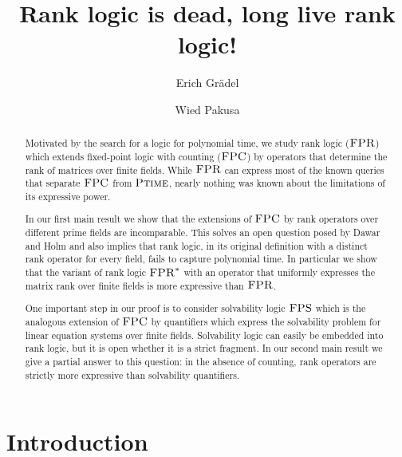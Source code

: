 \documentclass[a4paper,UKenglish]{lipics}
\title{Rank logic is dead, long live rank logic!}
\author{Erich Grädel}
\author{Wied Pakusa}
\affil{Mathematical Foundations of Computer Science, RWTH Aachen University\\
  \texttt{\{graedel,pakusa\}@logic.rwth-aachen.de}}
\newcommand{\logic}[1]{\ensuremath{\textsc{#1}}\xspace}
\newcommand{\FPC}{\logic{FPC}}
\newcommand{\FPRK}{\logic{FPR}}
\newcommand{\FPR}{\FPRK}
\newcommand{\FPS}{\ensuremath{\logic{FPS}}\xspace}
\newcommand{\FPRvar}{\ensuremath{\logic{FPR}^*}\xspace}
\newcommand{\compclass}[1]{\ensuremath{\textsc{#1}}\xspace}
\newcommand{\PTIME}{\compclass{Ptime}}
\theoremstyle{plain}
\begin{document}
\maketitle

\begin{abstract}
Motivated by the search for a logic for polynomial time, we study 
rank logic (\FPR) which extends fixed-point logic with counting 
(\FPC) by operators that determine the rank of matrices over finite fields.
While  $\FPR$ can express most of the known queries that 
separate $\FPC$ from $\PTIME$, nearly nothing was known about the limitations 
of its expressive power.

In our first main result we show that the extensions of \FPC by rank operators 
over different prime fields are incomparable. This 
solves an open question posed by Dawar and Holm and also implies that rank 
logic, in its original definition with a distinct rank operator for every 
field, 
fails to capture polynomial time.
In particular we show that the variant of rank logic $\FPRvar$ with an operator 
that uniformly expresses the matrix rank over finite fields is more expressive 
than $\FPR$.

One important step in our proof is to consider solvability logic \FPS which is 
the analogous extension of \FPC by quantifiers which express the solvability 
problem for linear equation systems over finite fields.
Solvability logic can easily be embedded into rank logic, but it is open 
whether it is a strict fragment.
In our second main result we give a partial answer to this question: 
in the absence of  counting, rank operators are strictly more expressive than 
solvability quantifiers.
\end{abstract}

\section{Introduction}
\end{document}

